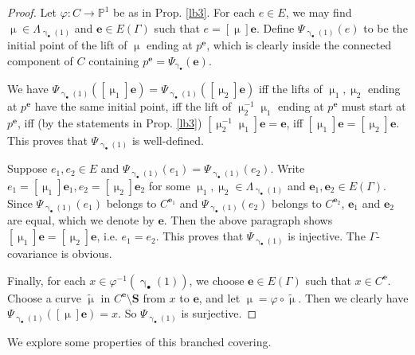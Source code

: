 \documentclass[12pt,a4paper,notitlepage]{article}
\theoremstyle{definition}
\theoremstyle{plain}
\newcommand{\wtd}{\widetilde}
\newcommand{\mbf}{\mathbf}
\newcommand{\blt}{\bullet}
\newcommand{\Pbb}{\mathbb P}
\newcommand{\Sbf}{\mathbf{S}}
\numberwithin{equation}{subsection}
\begin{document}
\begin{proof}
Let $\varphi:C\rightarrow\Pbb^1$ be as in Prop. \ref{lb3}. For each $e\in E$, we may find $\upmu\in\Lambda_{\upgamma_\blt(1)}$ and $\mbf e\in E(\Gamma)$ such that $e=[\upmu]\mbf e$. Define $\Psi_{\upgamma_\blt(1)}(e)$ to be the initial point of the lift of $\upmu$ ending at $p^{\mbf e}$, which is clearly inside the connected component of $C$ containing $p^{\mbf e}=\Psi_{\upgamma_\blt}(\mbf e)$.

We have $\Psi_{\upgamma_\blt(1)}([\upmu_1]\mbf e)=\Psi_{\upgamma_\blt(1)}([\upmu_2]\mbf e)$ iff the lifts of $\upmu_1,\upmu_2$ ending at $p^{\mbf e}$ have the same initial point, iff the lift of $\upmu_2^{-1}\upmu_1$ ending at $p^{\mbf e}$ must start at $p^{\mbf e}$, iff (by the statements in Prop. \ref{lb3}) $[\upmu_2^{-1}\upmu_1]\mbf e=\mbf e$, iff $[\upmu_1]\mbf e=[\upmu_2]\mbf e$. This proves that $\Psi_{\upgamma_\blt(1)}$ is well-defined.

Suppose $e_1,e_2\in E$ and $\Psi_{\upgamma_\blt(1)}(e_1)=\Psi_{\upgamma_\blt(1)}(e_2)$. Write $e_1=[\upmu_1]\mbf e_1,e_2=[\upmu_2]\mbf e_2$ for some $\upmu_1,\upmu_2\in\Lambda_{\upgamma_\blt(1)}$ and $\mbf e_1,\mbf e_2\in E(\Gamma)$. Since $\Psi_{\upgamma_\blt(1)}(e_1)$ belongs to $C^{\mbf e_1}$ and $\Psi_{\upgamma_\blt(1)}(e_2)$ belongs to $C^{\mbf e_2}$,  $\mbf e_1$ and $\mbf e_2$ are equal, which we denote by $\mbf e$. Then the above paragraph shows $[\upmu_1]\mbf e=[\upmu_2]\mbf e$, i.e. $e_1=e_2$. This proves that $\Psi_{\upgamma_\blt(1)}$ is injective. The $\Gamma$-covariance is obvious.

Finally, for each $x\in \varphi^{-1}(\upgamma_\blt(1))$, we choose $\mbf e\in E(\Gamma)$ such that $x\in C^{\mbf e}$. Choose a curve $\wtd\upmu$ in $C^{\mbf e}\setminus\Sbf$ from $x$ to $\mbf e$, and let $\upmu=\varphi\circ\wtd\upmu$. Then we clearly have $\Psi_{\upgamma_\blt(1)}([\upmu]\mbf e)=x$. So $\Psi_{\upgamma_\blt(1)}$ is surjective.
\end{proof}







We explore some properties of this branched covering. 
\end{document}
